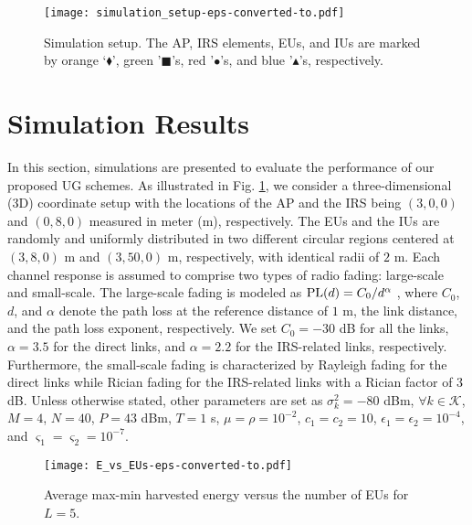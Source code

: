 \documentclass[12pt,draftclsnofoot, onecolumn]{IEEEtran}
\theoremstyle{plain}
\begin{document}
\begin{sloppypar}
\begin{figure}[!t]
	\centering
	\texttt{[image: simulation\_setup-eps-converted-to.pdf]}
	\caption{Simulation setup. The AP, IRS elements, EUs, and IUs are marked by orange `$\blacklozenge$', green '$\blacksquare$'s, red '$\bullet$'s, and blue '$\blacktriangle$'s, respectively.} \label{Fig:simulation_setup}
	\vspace{-2mm}
\end{figure}

\section{Simulation Results}\label{Sec:simulation}
In this section, simulations are presented to evaluate the performance of our proposed UG schemes. As illustrated in Fig. \ref{Fig:simulation_setup}, we consider a three-dimensional (3D) coordinate setup with the locations of the AP and the IRS being $\left(3, 0, 0\right)$ and $\left(0, 8, 0 \right)$ measured in meter (m), respectively. The EUs and the IUs are randomly and uniformly distributed in two different circular regions centered at $\left(3, 8, 0\right)$ m and $\left(3, 50, 0\right)$ m, respectively, with identical radii of $2$ m. Each channel response is assumed to comprise two types of radio fading: large-scale and small-scale. The large-scale fading is modeled as ${\rm PL}(d) = C_0/d^{\alpha}$ \cite{2019_Qingqing_Joint}, where $C_0$, $d$, and $\alpha$ denote the path loss at the reference distance of $1$ m, the link distance, and the path loss exponent, respectively. We set $C_0 = -30$ dB for all the links, $\alpha = 3.5$ for the direct links, and $\alpha = 2.2$ for the IRS-related links, respectively. Furthermore, the small-scale fading is characterized by Rayleigh fading for the direct links while Rician fading for the IRS-related links with a Rician factor of $3$ dB. Unless otherwise stated, other parameters are set as $\sigma_k^2 = -80$ dBm, $\forall k\in \mathcal K$, $M = 4$, $N = 40$, $P = 43$ dBm, $T = 1$ s, $\mu = \rho = 10^{-2}$, $c_1 = c_2 = 10$, $\epsilon_1 = \epsilon_2 = 10^{-4}$, and $\varsigma_1 = \varsigma_2 = 10^{-7}$. 

\begin{figure}[!t]
	\centering
	\texttt{[image: E\_vs\_EUs-eps-converted-to.pdf]}\vspace{-1.5mm}
	\caption{Average max-min harvested energy versus the number of EUs for $L = 5$.}
	\label{fig:E_vs_EUs}
	\vspace{-3mm}
\end{figure}


\end{sloppypar}
\end{document}
